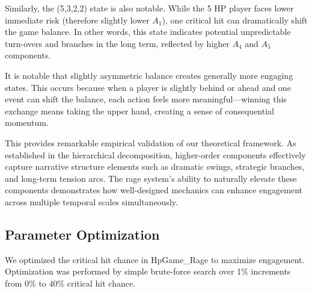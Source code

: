\documentclass{article}
\begin{document}
Similarly, the (5,3,2,2) state is also notable. While the 5 HP player faces lower immediate risk (therefore slightly lower $A_1$), one critical hit can dramatically shift the game balance. In other words, this state indicates potential unpredictable turn-overs and branches in the long term, reflected by higher $A_4$ and $A_5$ components.

It is notable that slightly asymmetric balance creates generally more engaging states. This occurs because when a player is slightly behind or ahead and one event can shift the balance, each action feels more meaningful—winning this exchange means taking the upper hand, creating a sense of consequential momentum.

This provides remarkable empirical validation of our theoretical framework. As established in the hierarchical decomposition, higher-order components effectively capture narrative structure elements such as dramatic swings, strategic branches, and long-term tension arcs. The rage system's ability to naturally elevate these components demonstrates how well-designed mechanics can enhance engagement across multiple temporal scales simultaneously.

\subsection{Parameter Optimization}

We optimized the critical hit chance in HpGame\_Rage to maximize engagement. Optimization was performed by simple brute-force search over 1\% increments from 0\% to 40\% critical hit chance.
\end{document}
